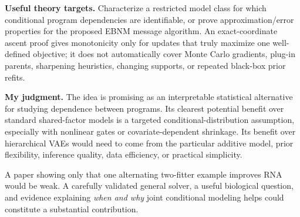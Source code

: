 \documentclass[11pt,a4paper]{article}
\numberwithin{equation}{section}
\begin{document}
\textbf{Useful theory targets.} Characterize a restricted model class for
which conditional program dependencies are identifiable, or prove
approximation/error properties for the proposed EBNM message algorithm.
An exact-coordinate ascent proof gives monotonicity only for updates
that truly maximize one well-defined objective; it does not automatically
cover Monte Carlo gradients, plug-in parents, sharpening heuristics,
changing supports, or repeated black-box prior refits.

\textbf{My judgment.} The idea is promising as an interpretable statistical
alternative for studying dependence between programs. Its clearest
potential benefit over standard shared-factor models is a targeted
conditional-distribution assumption, especially with nonlinear gates or
covariate-dependent shrinkage. Its benefit over hierarchical VAEs would
need to come from the particular additive model, prior flexibility,
inference quality, data efficiency, or practical simplicity.

A paper showing only that one alternating two-fitter example improves RNA
would be weak. A carefully validated general solver, a useful biological
question, and evidence explaining \emph{when and why} joint conditional
modeling helps could constitute a substantial contribution.
\end{document}
